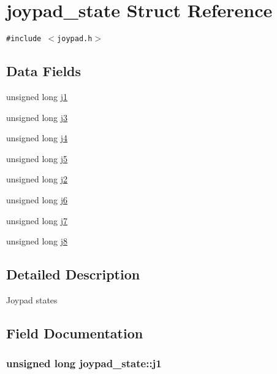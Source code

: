 \hypertarget{structjoypad__state}{
\section{joypad\_\-state Struct Reference}
\label{structjoypad__state}
}
{\tt \#include $<$joypad.h$>$}

\subsection*{Data Fields}
\begin{CompactItemize}
\item 
unsigned long \hyperlink{structjoypad__state_03231087d1c78f52dba2b00329b6e9d9}{j1}
\item 
unsigned long \hyperlink{structjoypad__state_7b9bb639ecaea5f5cc38693b7c876cc3}{j3}
\item 
unsigned long \hyperlink{structjoypad__state_40d75ff6dabb3b5101ae03dbec27a13f}{j4}
\item 
unsigned long \hyperlink{structjoypad__state_da972add2520e7e437514913300773d8}{j5}
\item 
unsigned long \hyperlink{structjoypad__state_c7491668ca373cf26025d334894a35b0}{j2}
\item 
unsigned long \hyperlink{structjoypad__state_2330eb7fe4da3cddc6e0a286047c6b75}{j6}
\item 
unsigned long \hyperlink{structjoypad__state_ead82eecb6a91d577364993ce6d479d4}{j7}
\item 
unsigned long \hyperlink{structjoypad__state_4d163e85f6d8fdeab81ea992cc9c058f}{j8}
\end{CompactItemize}


\subsection{Detailed Description}
Joypad states 

\subsection{Field Documentation}
\hypertarget{structjoypad__state_03231087d1c78f52dba2b00329b6e9d9}{
\subsubsection{\setlength{\rightskip}{0pt plus 5cm}unsigned long {\bf joypad\_\-state::j1}}}
\label{structjoypad__state_03231087d1c78f52dba2b00329b6e9d9}


